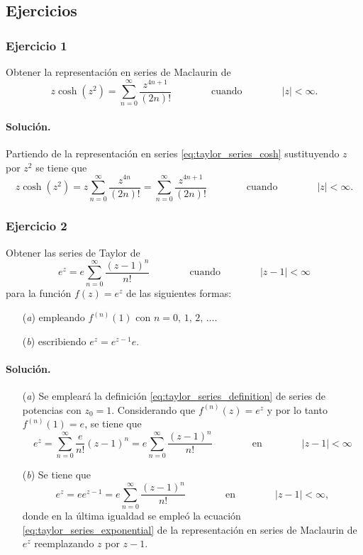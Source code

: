 \documentclass[a4paper]{report}
\begin{document}
\subsection*{Ejercicios}

\subsubsection*{Ejercicio 1}

Obtener la representación en series de Maclaurin de
\[
 z\cosh(z^2)=\sum_{n=0}^\infty\frac{z^{4n+1}}{(2n)!}
 \qquad\qquad\textrm{cuando}\qquad\qquad
 |z|<\infty.
\]

\paragraph{Solución.} Partiendo de la representación en series \ref{eq:taylor_series_cosh} sustituyendo \(z\) por \(z^2\) se tiene que  
\[
 z\cosh(z^2)=z\sum_{n=0}^\infty\frac{z^{4n}}{(2n)!}=\sum_{n=0}^\infty\frac{z^{4n+1}}{(2n)!}
 \qquad\qquad\textrm{cuando}\qquad\qquad
 |z|<\infty.
\]

\subsubsection*{Ejercicio 2}

Obtener las series de Taylor de
\[
 e^z=e\sum_{n=0}^\infty\frac{(z-1)^n}{n!}
 \qquad\qquad\textrm{cuando}\qquad\qquad
 |z-1|<\infty
\]
para la función \(f(z)=e^z\) de las siguientes formas:
\begin{enumerate}
 \item[(\textit{a})] empleando \(f^{(n)}(1)\) con \(n=0,\,1,\,2,\,\dots\).
 \item[(\textit{b})] escribiendo \(e^z=e^{z-1}e\).
\end{enumerate}

\paragraph{Solución.}

\begin{enumerate}
 \item[(\textit{a})] Se empleará la definición \ref{eq:taylor_series_definition} de series de potencias con \(z_0=1\). Considerando que \(f^{(n)}(z)=e^z\) y por lo tanto \(f^{(n)}(1)=e\), se tiene que 
 \[
  e^z=\sum_{n=0}^\infty\frac{e}{n!}(z-1)^n=e\sum_{n=0}^\infty\frac{(z-1)^n}{n!}
  \qquad\qquad\textrm{en}\qquad\qquad
  |z-1|<\infty
 \]
 \item[(\textit{b})] Se tiene que 
 \[
  e^z=ee^{z-1}=e\sum_{n=0}^\infty\frac{(z-1)^n}{n!}
  \qquad\qquad\textrm{en}\qquad\qquad
  |z-1|<\infty,
 \]
 donde en la última igualdad se empleó la ecuación \ref{eq:taylor_series_exponential} de la representación en series de Maclaurin de \(e^z\) reemplazando \(z\) por \(z-1\).
\end{enumerate}
\end{document}
